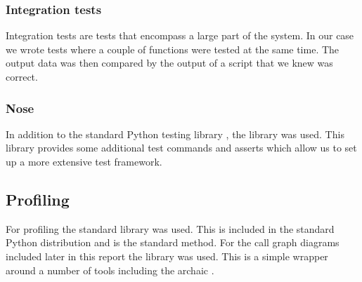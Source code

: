 \documentclass[a4paper, openany, oneside]{memoir}
\begin{document}
\subsubsection{Integration tests}
Integration tests are tests that encompass a large part of the system. In our case we wrote tests where a couple of functions were tested at the same time. The output data was then compared by the output of a \matlab{} script that we knew was correct.

\subsubsection{Nose}
\label{ssub:Nose}
In addition to the standard Python testing library , the library  was used. This library provides some additional test commands and asserts which allow us to set up a more extensive test framework.


\subsection{Profiling}
\label{sec:profiling}
For profiling the standard  library was used. This is included in the standard Python distribution and is the standard method. For the call graph diagrams included later in this report the library  was used. This is a simple wrapper around a number of tools including the archaic .
\end{document}
